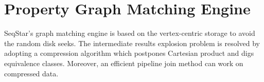 \section{Property Graph Matching Engine}\label{sec:match}


SeqStar's graph matching engine is based on the vertex-centric storage to avoid the random disk seeks.
The intermediate results explosion problem is resolved by adopting a compression algorithm which postpones Cartesian product and digs equivalence classes.
Moreover, an efficient pipeline join method can work on compressed data.




